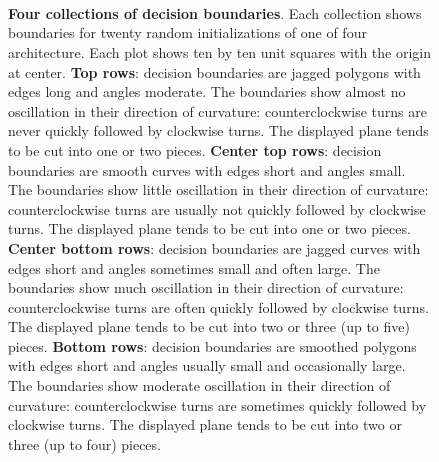 \documentclass[11pt, justified]{tufte-book}
\theoremstyle{definition}
\begin{document}
        \begin{figure}[h]
          \centering%
            ~\\
            ~\\
            ~\\
          \caption{%
              \textbf{Four collections of decision boundaries}.  Each
              collection shows boundaries for twenty random initializations of
              one of four architecture.  Each plot shows ten by ten unit
              squares with the origin at center.
            \textbf{Top rows}:
            decision boundaries are jagged polygons with edges long and angles moderate. 
            The boundaries show almost no oscillation in their direction of curvature:
            counterclockwise turns are never quickly followed by clockwise turns. 
            The displayed plane tends to be cut into one or two pieces. 
            \textbf{Center top rows}:
            decision boundaries are smooth curves with edges short and angles small. 
            The boundaries show little oscillation in their direction of
            curvature: counterclockwise turns are usually not quickly followed
            by clockwise turns. 
            The displayed plane tends to be cut into one or two pieces. 
            \textbf{Center bottom rows}:
            decision boundaries are jagged curves with edges short and angles sometimes small and often large. 
            The boundaries show much oscillation in their direction of
            curvature: counterclockwise turns are often quickly followed by
            clockwise turns. 
            The displayed plane tends to be cut into two or three (up to five) pieces. 
            \textbf{Bottom rows}:
            decision boundaries are smoothed polygons with edges short and angles usually small and occasionally large.
            The boundaries show moderate oscillation in their direction of
            curvature: counterclockwise turns are sometimes quickly followed by
            clockwise turns. 
            The displayed plane tends to be cut into two or three (up to four) pieces. 
          }
        \end{figure}
\end{document}

